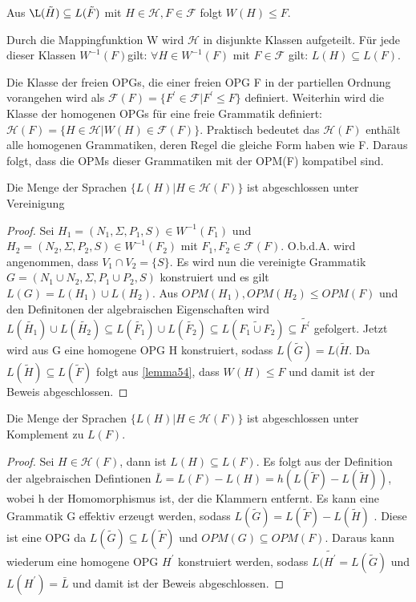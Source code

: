 \begin{lemma}
\label{lemma54}
Aus $\L(\tilde{H}) \subseteq L(\tilde{F})$ mit $H \in \mathcal{H}, F \in \mathcal{F}$ folgt $W(H) \leq F.$
\end{lemma}
Durch die Mappingfunktion W wird $\mathcal{H}$ in disjunkte Klassen aufgeteilt. Für jede dieser Klassen $W^{-1}(F)$gilt:  $\forall H \in W^{-1}(F)$ mit $F\in \mathcal{F}$ gilt: $L(H) \subseteq L(F)$.

 Die Klasse der freien OPGs, die einer freien OPG F in der partiellen Ordnung vorangehen wird als $\mathcal{F}(F)=\{F^\prime \in \mathcal{F} | F^\prime \leq F\}$ definiert. Weiterhin wird die Klasse der homogenen OPGs für eine freie Grammatik definiert: $\mathcal{H}(F)=\{H \in \mathcal{H}|W(H)\in \mathcal{F}(F)\}$. Praktisch bedeutet das $\mathcal{H}(F)$ enthält alle homogenen Grammatiken, deren Regel die gleiche Form haben wie F. Daraus folgt, dass die OPMs dieser Grammatiken mit der OPM(F) kompatibel sind.

\begin{theorem}[Vereinigung]
Die Menge der Sprachen $\{L(H)|H \in \mathcal{H}(F)\}$ ist abgeschlossen unter Vereinigung
\end{theorem}
\begin{proof}
Sei $H_1=(N_1, \Sigma, P_1, S) \in W^{-1}(F_1)$ und $H_2=(N_2, \Sigma, P_2, S) \in W^{-1}(F_2)$ mit $F_1, F_2 \in \mathcal{F}(F)$. O.b.d.A. wird angenommen, dass $V_1 \cap V_2 = \{S\}$. Es wird nun die vereinigte Grammatik $G=(N_1 \cup N_2, \Sigma, P_1 \cup P_2, S)$ konstruiert und es gilt $L(G)=L(H_1) \cup L(H_2)$. Aus $OPM(H_1), OPM(H_2) \leq OPM(F)$ und den Definitonen der algebraischen Eigenschaften wird $L(\tilde{H_1}) \cup L(\tilde{H_2}) \subseteq L(\tilde{F_1}) \cup L(\tilde{F_2}) \subseteq L(\widetilde{F_1 \cup F_2}) \subseteq \tilde{F^\prime}$ gefolgert. Jetzt wird aus G eine homogene OPG H konstruiert, sodass $L(\tilde{G})=L(\tilde{H}$. Da $L(\tilde{H}) \subseteq L(\tilde{F})$ folgt aus \ref{lemma54}, dass $W(H) \leq F$ und damit ist der Beweis abgeschlossen. 
\end{proof}


\begin{theorem}[Komplement]
Die Menge der Sprachen $\{L(H)|H \in \mathcal{H}(F)\}$ ist abgeschlossen unter Komplement zu $L(F)$.
\end{theorem}
\begin{proof}
Sei $H \in \mathcal{H}(F)$, dann ist $L(H) \subseteq L(F)$. Es folgt aus der Definition der algebraischen Defintionen $\bar{L}=L(F)-L(H)=h(L(\tilde{F}) - L(\tilde{H}))$, wobei h der Homomorphismus ist, der die Klammern entfernt. Es kann eine Grammatik G effektiv erzeugt werden, sodass $L(\tilde{G}) = L( \tilde{F}) - L(\tilde{H})$ \cite{McNaughton}. Diese ist eine OPG da $L(\tilde{G})\subseteq L(\tilde{F})$ und $OPM(G) \subseteq OPM(F)$. Daraus kann wiederum eine homogene OPG $H^\prime$ konstruiert werden, sodass $L(\tilde{H^\prime}=L(\tilde{G})$ und $L(H^\prime) = \bar{L}$ und damit ist der Beweis abgeschlossen.
\end{proof}

